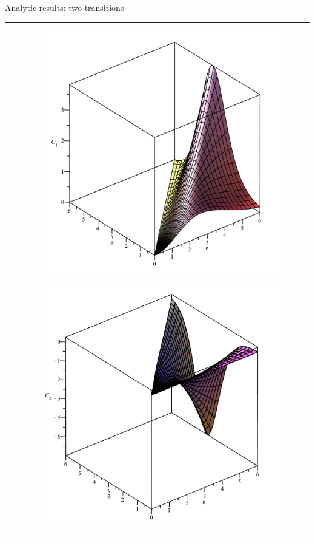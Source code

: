 \begin{frame}{Analytic results: two transitions}
\begin{tabular}{l l}
\begin{minipage}{0.62\textwidth}
		\end{minipage}
		&
		\begin{minipage}{0.38\textwidth}
			\vspace{-15pt}
			\begin{figure}
				\centering
				\includegraphics[height=0.44\textheight,keepaspectratio=true]{../src/plot/discreteSystems/C1InFunctionOfEpsilonAndDelta_1-eps-converted-to.pdf}
			\end{figure}
			\vspace{-25pt}
			\begin{figure}
				\centering
				\includegraphics[height=0.44\textheight,keepaspectratio=true]{../src/plot/discreteSystems/C2InFunctionOfEpsilonAndDelta_1-eps-converted-to.pdf}

\end{figure}
\end{minipage}
\end{tabular}
\end{frame}
